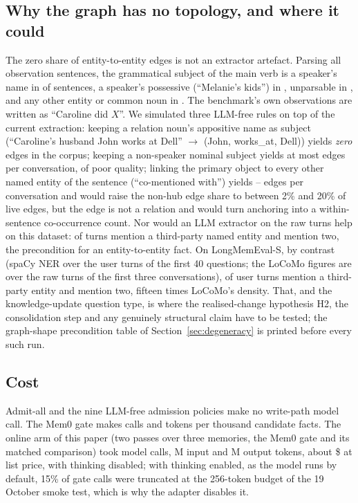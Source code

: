 \documentclass{ceurart}
\begin{document}
\subsection{Why the graph has no topology, and where it could}
\label{sec:shape}
The zero share of entity-to-entity edges is not an extractor artefact. Parsing all \nObsSentences{} observation sentences, the grammatical subject of the main verb is a speaker's name in \obsSpeakerSubjShare{} of sentences, a speaker's possessive (``Melanie's kids'') in \obsPossSubjShare, unparsable in \obsParseFailShare, and any other entity or common noun in \obsNonSpeakerSubjShare. The benchmark's own observations are written as ``Caroline did $X$''. We simulated three LLM-free rules on top of the current extraction: keeping a relation noun's appositive name as subject (``Caroline's husband John works at Dell'' $\to$ (John, works\_at, Dell)) yields \emph{zero} edges in the corpus; keeping a non-speaker nominal subject yields at most  edges per conversation, of poor quality; linking the primary object to every other named entity of the sentence (``co-mentioned with'') yields -- edges per conversation and would raise the non-hub edge share to between 2\% and 20\% of live edges, but the edge is not a relation and would turn anchoring into a within-sentence co-occurrence count. Nor would an LLM extractor on the raw turns help on this dataset: \rawTurnsOneNE{} of turns mention a third-party named entity and \rawTurnsTwoNE{} mention two, the precondition for an entity-to-entity fact. On LongMemEval-S, by contrast (spaCy NER over the user turns of the first 40 questions; the LoCoMo figures are over the raw turns of the first three conversations), \lmeTurnsOneNE{} of user turns mention a third-party entity and \lmeTurnsTwoNE{} mention two, fifteen times LoCoMo's density. That, and the knowledge-update question type, is where the realised-change hypothesis H2, the consolidation step and any genuinely structural claim have to be tested; the graph-shape precondition table of Section~\ref{sec:degeneracy} is printed before every such run.

\subsection{Cost}
Admit-all and the nine LLM-free admission policies make no write-path model call. The Mem0 gate makes \memzCallsPerK{} calls and \memzTokensPerK{} tokens per thousand candidate facts. The online arm of this paper (two passes over three memories, the Mem0 gate and its matched comparison) took \haikuCalls{} model calls, \haikuInTokens{}M input and \haikuOutTokens{}M output tokens, about \$\haikuCostUsd{} at list price, with thinking disabled; with thinking enabled, as the model runs by default, 15\% of gate calls were truncated at the 256-token budget of the 19 October smoke test, which is why the adapter disables it.
\end{document}
